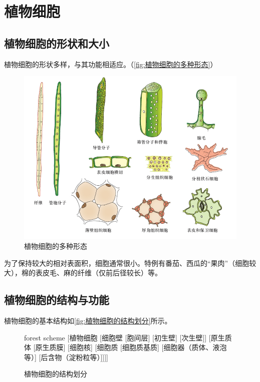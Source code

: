 
	\section{植物细胞}
	
	\subsection{植物细胞的形状和大小}
	
	植物细胞的形状多样，与其功能相适应。（\autoref{fig:植物细胞的多种形态}）
	
	\begin{figure}[htbp]
		\centering
		\includegraphics[width=\linewidth]{Pics/植物细胞的多种形态}
		\caption{植物细胞的多种形态}
		\label{fig:植物细胞的多种形态}
	\end{figure}
	
	
	为了保持较大的相对表面积，细胞通常很小。特例有番茄、西瓜的“果肉”（细胞较大），棉的表皮毛、麻的纤维（仅前后径较长）等。
	
	\subsection{植物细胞的结构与功能}
	
	植物细胞的基本结构如\autoref{fig:植物细胞的结构划分}所示。
	
	\begin{figure}[htbp]
		\centering
		\begin{forest}
			forest scheme
			[植物细胞
				[细胞壁
					[胞间层]
					[初生壁]
					[次生壁]]
				[原生质体
					[原生质膜]
					[细胞核]
					[细胞质
						[细胞质基质]
						[细胞器（质体、液泡等）]
						[后含物（淀粉粒等）]]]]
		\end{forest}
		\caption{植物细胞的结构划分}
		\label{fig:植物细胞的结构划分}
	\end{figure}
	
